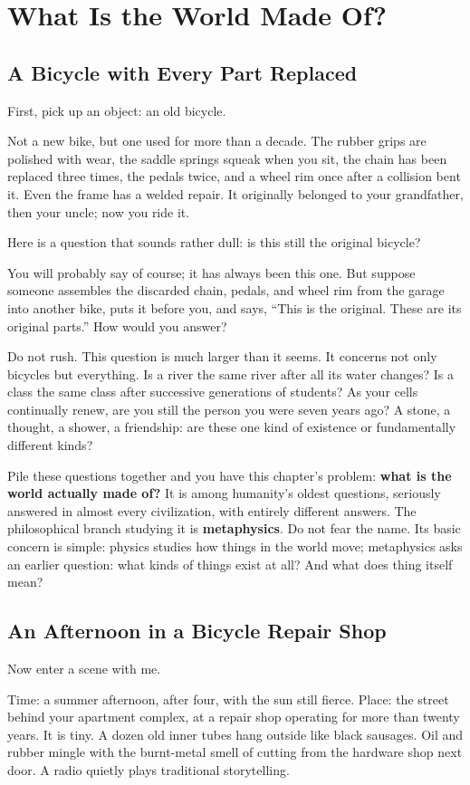 \chapter{What Is the World Made Of?}
\section{A Bicycle with Every Part Replaced}
First, pick up an object: an old bicycle.

Not a new bike, but one used for more than a decade. The rubber grips are polished with wear, the saddle springs squeak when you sit, the chain has been replaced three times, the pedals twice, and a wheel rim once after a collision bent it. Even the frame has a welded repair. It originally belonged to your grandfather, then your uncle; now you ride it.

Here is a question that sounds rather dull: is this still the original bicycle?

You will probably say of course; it has always been this one. But suppose someone assembles the discarded chain, pedals, and wheel rim from the garage into another bike, puts it before you, and says, ``This is the original. These are its original parts.'' How would you answer?

Do not rush. This question is much larger than it seems. It concerns not only bicycles but everything. Is a river the same river after all its water changes? Is a class the same class after successive generations of students? As your cells continually renew, are you still the person you were seven years ago? A stone, a thought, a shower, a friendship: are these one kind of existence or fundamentally different kinds?

Pile these questions together and you have this chapter's problem: \textbf{what is the world actually made of?} It is among humanity's oldest questions, seriously answered in almost every civilization, with entirely different answers. The philosophical branch studying it is \textbf{metaphysics}. Do not fear the name. Its basic concern is simple: physics studies how things in the world move; metaphysics asks an earlier question: what kinds of things exist at all? And what does thing itself mean?

\section{An Afternoon in a Bicycle Repair Shop}
Now enter a scene with me.

Time: a summer afternoon, after four, with the sun still fierce. Place: the street behind your apartment complex, at a repair shop operating for more than twenty years. It is tiny. A dozen old inner tubes hang outside like black sausages. Oil and rubber mingle with the burnt-metal smell of cutting from the hardware shop next door. A radio quietly plays traditional storytelling.

